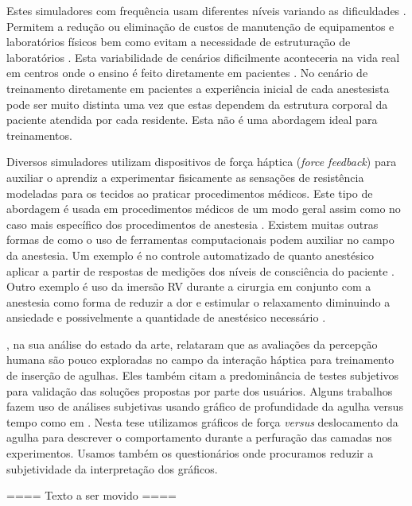 Estes simuladores com frequência usam diferentes níveis variando as dificuldades \cite{Ullrich2012}. Permitem a redução ou eliminação de custos de manutenção de equipamentos e laboratórios físicos bem como evitam a necessidade de estruturação de laboratórios \cite{Silva2018}. 
Esta variabilidade de cenários dificilmente aconteceria na vida real em centros onde o ensino é feito diretamente em pacientes \cite{Udani2015}. No cenário de treinamento diretamente em pacientes a experiência inicial de cada anestesista pode ser muito distinta uma vez que estas dependem da estrutura corporal da paciente atendida por cada residente. Esta não é uma abordagem ideal para treinamentos. 

Diversos simuladores utilizam dispositivos de força háptica (\textit{force feedback}) para auxiliar o aprendiz a experimentar fisicamente as sensações de resistência modeladas para os tecidos ao praticar procedimentos médicos. Este tipo de abordagem é usada em procedimentos médicos de um modo geral \cite{Escobar-Castillejos2016, Patel2021} assim como no caso mais específico dos procedimentos de anestesia \cite{Vaughan2013, Collaco2021}. Existem muitas outras formas de como o uso de ferramentas computacionais podem auxiliar no campo da anestesia. Um exemplo é no controle automatizado de quanto anestésico aplicar a partir de respostas de medições dos níveis de consciência do paciente \cite{Mendez2009}. Outro exemplo é uso da imersão \acrshort{RV} durante a cirurgia em conjunto com a anestesia como forma de reduzir a dor e estimular o relaxamento diminuindo a ansiedade e possivelmente a quantidade de anestésico necessário \cite{Eijlers2019}.

\textcite{Correa2019}, na sua análise do estado da arte, relataram que as avaliações da percepção humana são pouco exploradas no campo da interação háptica para treinamento de inserção de agulhas. Eles também citam a predominância de testes subjetivos para validação das soluções propostas por parte dos usuários. Alguns trabalhos fazem uso de análises subjetivas usando gráfico de profundidade da agulha versus tempo como em \textcite{Magill2010}. Nesta tese utilizamos gráficos de força \textit{versus} deslocamento da agulha para descrever o comportamento durante a perfuração das camadas nos experimentos. Usamos também os questionários onde procuramos reduzir a subjetividade da interpretação dos gráficos. 

==== Texto a ser movido ====

